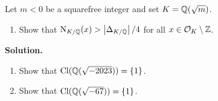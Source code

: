 \documentclass[a4paper,11pt]{article}
\begin{document}
Let $m<0$ be a squarefree integer and set $K =\mathbb{Q}(\sqrt m)$.
\begin{enumerate}
    \item Show that $\operatorname{N}_{K/\mathbb{Q}}(x) > \left\lvert \Delta_{K/\mathbb{Q}} \right\rvert/4$ for all $x \in \mathcal{O}_K\setminus \mathbb{Z}$. 
\end{enumerate}
\textbf{Solution.}

\begin{enumerate}
    \item Show that $\operatorname{Cl}(\mathbb{Q}(\sqrt{-2023})) = \{1\}$.
    \item Show that $\operatorname{Cl}(\mathbb{Q}(\sqrt{-67})) = \{1\}$.
\end{enumerate}


\contactend
\end{document}
